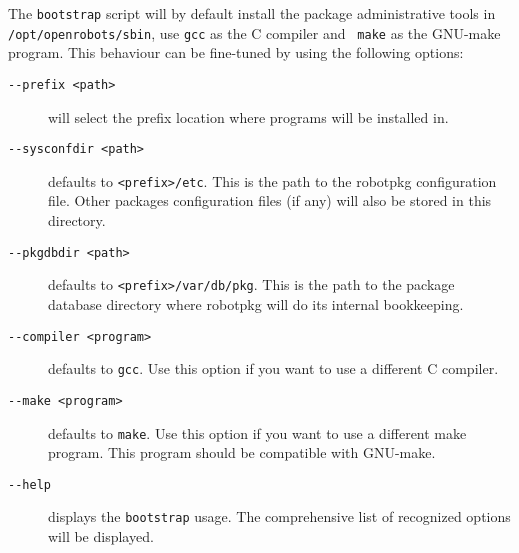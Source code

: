 The {\tt bootstrap} script will by default install the package administrative
tools in {\tt /opt/openrobots/sbin}, use {\tt gcc} as the C compiler and {\tt
make} as the GNU-make program. This behaviour can be fine-tuned by using the
following options:

\begin{description}
   \item[\tt   -{}-prefix <path>]   will   select the  prefix  location where
   programs will be installed in.

   \item[\tt -{}-sysconfdir <path>] defaults to {\tt <prefix>/etc}. This is the
   path to the robotpkg configuration file.  Other packages configuration files
   (if any) will also be stored in this directory.

   \item[\tt -{}-pkgdbdir  <path>] defaults to {\tt  <prefix>/var/db/pkg}. This
   is the path  to the package database  directory  where robotpkg will  do its
   internal bookkeeping.

   \item[\tt -{}-compiler <program>] defaults to {\tt gcc}.  Use this option if
   you want to use a different C compiler.

   \item[\tt -{}-make <program>] defaults to {\tt make}. Use this option if you
   want to use a different make program. This program should be compatible with
   GNU-make.

   \item[\tt -{}-help] displays the {\tt bootstrap}  usage. The comprehensive list of
   recognized options will be displayed.
\end{description}
